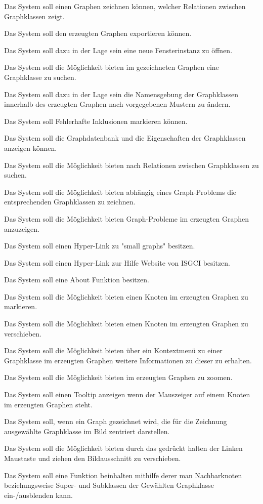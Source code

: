 \documentclass[11pt,a4paper]{article}
\begin{document}
	\begin{description}[leftmargin=.9cm]
\item[1] Das System soll einen Graphen zeichnen können, welcher Relationen zwischen Graphklassen zeigt.
\item[2] Das System soll den erzeugten Graphen exportieren können.
\item[3] Das System soll dazu in der Lage sein eine neue Fensterinstanz zu öffnen.
\item[4] Das System soll die Möglichkeit bieten im gezeichneten Graphen eine Graphklasse zu suchen. 
\item[5] Das System soll dazu in der Lage sein die Namensgebung der Graphklassen innerhalb des erzeugten Graphen nach vorgegebenen Mustern zu ändern.
\item[6] Das System soll Fehlerhafte Inklusionen markieren können.
\item[7] Das System soll die Graphdatenbank und die Eigenschaften der Graphklassen anzeigen können. 
\item[8] Das System soll die Möglichkeit bieten nach Relationen zwischen Graphklassen zu suchen.
\item[9] Das System soll die Möglichkeit bieten abhängig eines Graph-Problems die entsprechenden Graphklassen zu zeichnen.
\item[10] Das System soll die Möglichkeit bieten Graph-Probleme im erzeugten Graphen anzuzeigen.
\item[11] Das System soll einen Hyper-Link zu "small graphs" besitzen.
\item[12] Das System soll einen Hyper-Link zur Hilfe Website von ISGCI besitzen.
\item[13] Das System soll eine About Funktion besitzen.
\item[14] Das System soll die Möglichkeit bieten einen Knoten im erzeugten Graphen zu markieren.
\item[15] Das System soll die Möglichkeit bieten einen Knoten im erzeugten Graphen zu verschieben.
\item[16] Das System soll die Möglichkeit bieten über ein Kontextmenü zu einer Graphklasse im erzeugten Graphen weitere Informationen zu dieser zu erhalten.
\item[17] Das System soll die Möglichkeit bieten im erzeugten Graphen zu zoomen.
\item[18] Das System soll einen Tooltip anzeigen wenn der Mauszeiger auf einem Knoten im erzeugten Graphen steht.
\item[19] Das System soll, wenn ein Graph gezeichnet wird, die für die Zeichnung ausgewählte Graphklasse im Bild zentriert darstellen.
\item[20] Das System soll die Möglichkeit bieten durch das gedrückt halten der Linken Maustaste und ziehen den Bildausschnitt zu verschieben.
\item[21] Das System soll eine Funktion beinhalten mithilfe derer man Nachbarknoten beziehungsweise Super- und Subklassen der Gewählten Graphklasse ein-/ausblenden kann.

\end{description}
     
\end{document}
